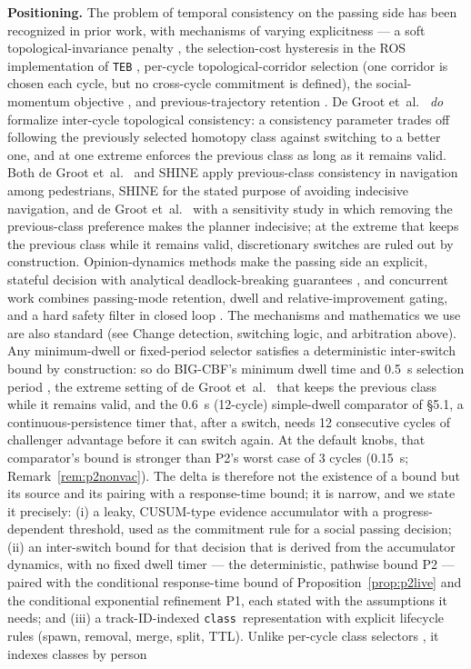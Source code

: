 \documentclass[11pt]{article}
\newcommand{\Class}{\texttt{class}}
\begin{document}
\textbf{Positioning.} The problem of temporal consistency on the passing side has been recognized in prior work, with mechanisms of varying explicitness --- a soft topological-invariance penalty \cite{mavrogiannis2023winding}, the selection-cost hysteresis in the ROS implementation of \texttt{TEB} \cite{rosmann2017teb}, per-cycle topological-corridor selection \cite{cao2019dynamicchannel} (one corridor is chosen each cycle, but no cross-cycle commitment is defined), the social-momentum objective \cite{mavrogiannis2022momentum}, and previous-trajectory retention \cite{zhou2023minimally}. De Groot et~al.~\cite{degroot2024topology} \emph{do} formalize inter-cycle topological consistency: a consistency parameter trades off following the previously selected homotopy class against switching to a better one, and at one extreme enforces the previous class as long as it remains valid. Both de Groot et~al.~\cite{degroot2024topology} and SHINE \cite{martinezbaselga2026shine} apply previous-class consistency in navigation among pedestrians, SHINE for the stated purpose of avoiding indecisive navigation, and de Groot et~al.~\cite{degroot2024topology} with a sensitivity study in which removing the previous-class preference makes the planner indecisive; at the extreme that keeps the previous class while it remains valid, discretionary switches are ruled out by construction. Opinion-dynamics methods make the passing side an explicit, stateful decision with analytical deadlock-breaking guarantees \cite{cathcart2023opinion}, and concurrent work combines passing-mode retention, dwell and relative-improvement gating, and a hard safety filter in closed loop \cite{li2026bigcbf}. The mechanisms and mathematics we use are also standard (see Change detection, switching logic, and arbitration above). Any minimum-dwell or fixed-period selector satisfies a deterministic inter-switch bound by construction: so do BIG-CBF's minimum dwell time and 0.5~s selection period \cite{li2026bigcbf}, the extreme setting of de Groot et~al.~\cite{degroot2024topology} that keeps the previous class while it remains valid, and the 0.6~s (12-cycle) simple-dwell comparator of \S5.1, a continuous-persistence timer that, after a switch, needs 12 consecutive cycles of challenger advantage before it can switch again. At the default knobs, that comparator's bound is stronger than P2's worst case of 3 cycles (0.15~s; Remark~\ref{rem:p2nonvac}). The delta is therefore not the existence of a bound but its source and its pairing with a response-time bound; it is narrow, and we state it precisely: (i) a leaky, CUSUM-type evidence accumulator with a progress-dependent threshold, used as the commitment rule for a social passing decision; (ii) an inter-switch bound for that decision that is derived from the accumulator dynamics, with no fixed dwell timer --- the deterministic, pathwise bound P2 --- paired with the conditional response-time bound of Proposition~\ref{prop:p2live} and the conditional exponential refinement P1, each stated with the assumptions it needs; and (iii) a track-ID-indexed \Class\ representation with explicit lifecycle rules (spawn, removal, merge, split, TTL). Unlike per-cycle class selectors \cite{rosmann2017teb, cao2019dynamicchannel, degroot2024topology, martinezbaselga2026shine}, it indexes classes by person 
\end{document}
